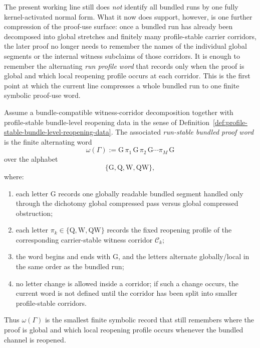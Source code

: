 \begin{remark}
\label{rem:status-of-the-first-profile-to-run-compression-step}
The present working line still does \emph{not} identify all bundled runs by one fully kernel-activated normal form. What it now does support, however, is one further compression of the proof-use surface: once a bundled run has already been decomposed into global stretches and finitely many profile-stable carrier corridors, the later proof no longer needs to remember the names of the individual global segments or the internal witness subclaims of those corridors. It is enough to remember the alternating \emph{run profile word} that records only when the proof is global and which local reopening profile occurs at each corridor. This is the first point at which the current line compresses a whole bundled run to one finite symbolic proof-use word.
\end{remark}

\begin{definition}
\label{def:run-stable-bundled-proof-word}
Assume a bundle-compatible witness-corridor decomposition together with profile-stable bundle-level reopening data in the sense of Definition~\ref{def:profile-stable-bundle-level-reopening-data}. The associated \emph{run-stable bundled proof word} is the finite alternating word
\[
\omega(\Gamma):=\mathrm{G}\,\pi_1\,\mathrm{G}\,\pi_2\,\mathrm{G}\cdots \pi_M\,\mathrm{G}
\]
over the alphabet
\[
\{\mathrm{G},\mathrm{Q},\mathrm{W},\mathrm{QW}\},
\]
where:
\begin{enumerate}[leftmargin=2em,label=(\roman*)]
\item each letter $\mathrm{G}$ records one globally readable bundled segment handled only through the dichotomy global compressed pass versus global compressed obstruction;
\item each letter $\pi_k\in\{\mathrm{Q},\mathrm{W},\mathrm{QW}\}$ records the fixed reopening profile of the corresponding carrier-stable witness corridor $\mathcal C_k$;
\item the word begins and ends with $\mathrm{G}$, and the letters alternate globally/local in the same order as the bundled run;
\item no letter change is allowed inside a corridor; if such a change occurs, the current word is not defined until the corridor has been split into smaller profile-stable corridors.
\end{enumerate}
Thus $\omega(\Gamma)$ is the smallest finite symbolic record that still remembers where the proof is global and which local reopening profile occurs whenever the bundled channel is reopened.
\end{definition}

